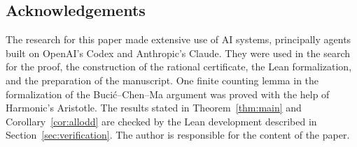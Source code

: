 \subsection*{Acknowledgements}
The research for this paper made extensive use of AI systems, principally agents built on OpenAI's Codex and Anthropic's Claude. They were used in the search for the proof, the construction of the rational certificate, the Lean formalization, and the preparation of the manuscript. One finite counting lemma in the formalization of the Buci\'c--Chen--Ma argument was proved with the help of Harmonic's Aristotle. The results stated in Theorem~\ref{thm:main} and Corollary~\ref{cor:allodd} are checked by the Lean development described in Section~\ref{sec:verification}. The author is responsible for the content of the paper.
